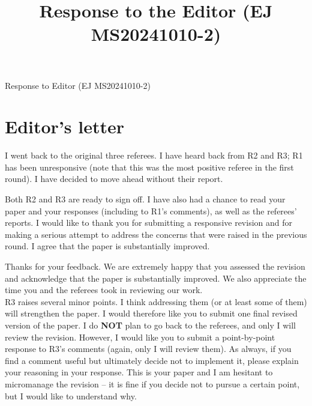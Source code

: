 \documentclass[11pt]{article}
\author{}
\title{Response to the Editor (EJ MS20241010-2)}
\date{}
\newcommand{\comment}[1]{\begingroup #1\endgroup}
\newcommand{\answer}[1]{\begingroup\color{navy}#1\endgroup}
\begin{document}

\begin{center}
   \LARGE{Response to Editor (EJ MS20241010-2)}
\end{center}

\vspace{0.5em}

% 

\section*{Editor's letter}


\comment{I went back to the original three referees. I have heard back from R2 and R3; R1 has been unresponsive (note that this was the most positive referee in the first round). I have decided to move ahead without their report.}\par

\comment{Both R2 and R3 are ready to sign off. I have also had a chance to read your paper and your responses (including to R1's comments), as well as the referees' reports. I would like to thank you for submitting a responsive revision and for making a serious attempt to address the concerns that were raised in the previous round. I agree that the paper is substantially improved.}\par

\answer{Thanks for your feedback. We are extremely happy that you assessed the revision and acknowledge that the paper is substantially improved. We also appreciate the time you and the referees took in reviewing our work.}\\


\comment{R3 raises several minor points. I think addressing them (or at least some of them) will strengthen the paper. I would therefore like you to submit one final revised version of the paper. I do \textbf{NOT} plan to go back to the referees, and only I will review the revision. However, I would like you to submit a point-by-point response to R3's comments (again, only I will review them). As always, if you find a comment useful but ultimately decide not to implement it, please explain your reasoning in your response. This is your paper and I am hesitant to micromanage the revision -- it is fine if you decide not to pursue a certain point, but I would like to understand why.}\par
\end{document}
